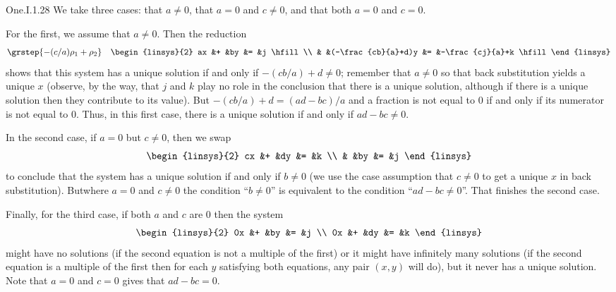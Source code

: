 \begin{ans}{One.I.1.28}
      We take three cases: that $a\neq 0$, that $a=0$ and
      $c\neq 0$, and that both $a=0$ and $c=0$.

      For the first, we assume that \( a\neq 0 \).
      Then the reduction
      \begin{eqnarray*}
        &\grstep{-(c/a)\rho_1+\rho_2}
        &\begin{linsys}{2}
          ax  &+  &by                  &=  &j \hfill \\
              &   &(-\frac{cb}{a}+d)y  &=  &-\frac{cj}{a}+k \hfill
         \end{linsys}
      \end{eqnarray*}
      shows that this system has a unique solution if and only if
      \( -(cb/a)+d\neq 0   \); remember that \( a\neq 0 \) so
      that back substitution yields a unique \( x \)
      (observe, by the way, that \( j \) and \( k \) play no role in the
      conclusion that there is a unique solution, although if there is a
      unique solution then they contribute to its value).
      But \( -(cb/a)+d = (ad-bc)/a \) and a fraction is not equal to \( 0 \)
      if and only if its numerator is not equal to \( 0 \).
      Thus, in this first case, there is a unique solution if and only if
      $ad-bc\neq 0$.

      In the second case, if \( a=0 \) but \( c\neq 0 \), then we swap
      \begin{equation*}
        \begin{linsys}{2}
          cx  &+  &dy  &=  &k  \\
              &   &by  &=  &j
        \end{linsys}
      \end{equation*}
      to conclude that the system has a unique solution if and only if
      \( b\neq 0 \)
      (we use the case assumption that \( c\neq 0 \) to get a unique
      \( x \) in back substitution).
      But\Dash where \( a=0 \) and \( c\neq 0 \)\Dash
      the condition ``\( b\neq 0 \)''
      is equivalent to the condition ``\( ad-bc\neq 0 \)''.
      That finishes the second case.

      Finally, for the third case,
      if both \( a \) and \( c \) are \( 0 \) then the system
      \begin{equation*}
        \begin{linsys}{2}
          0x  &+  &by  &=  &j  \\
          0x  &+  &dy  &=  &k
        \end{linsys}
      \end{equation*}
      might have no solutions (if the second equation is not a multiple of the
      first) or it might have infinitely many solutions (if the second
      equation is a multiple of the first then for each \( y \) satisfying
      both equations, any pair \( (x,y) \) will do), but it never has a unique
      solution.
      Note that \( a=0 \) and \( c=0 \) gives that \( ad-bc=0 \).
    
\end{ans}
